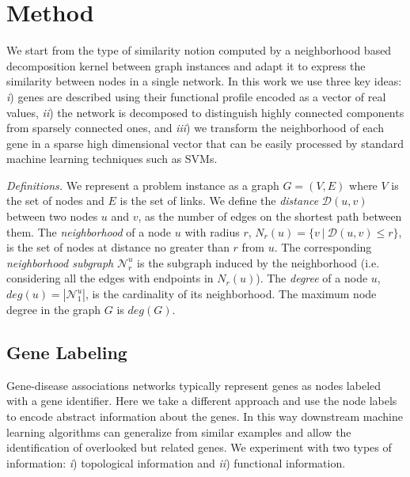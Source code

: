 \section{Method}
We start from the type of similarity notion computed by a neighborhood based decomposition kernel between graph instances and adapt it to express the similarity between nodes in a single network. In this work we use three key ideas: \textit{i}) genes are described using their functional profile encoded as a vector of real values, \textit{ii}) the network is decomposed to distinguish highly connected components from sparsely connected ones, and \textit{iii}) we transform the neighborhood of each gene in a sparse high dimensional vector that can be easily processed by standard machine learning techniques such as SVMs.

\textit{Definitions.} 
We represent a problem instance as a graph $G=(V,E)$ where $V$ is the set of nodes and $E$ is the set of links.
We define the \textit{distance} $\mathcal{D}(u,v)$ between two nodes $u$ and $v$, as the number of edges on the shortest path between them. The \textit{neighborhood} of a node $u$ with radius $r$, $N_r(u) = \lbrace v\ |\ \mathcal{D}(u,v) \leq r \rbrace$, is the set of nodes at distance no greater than $r$ from $u$. The corresponding \textit{neighborhood subgraph} $\mathcal{N}_{r}^{u}$ is the  subgraph induced by the neighborhood (i.e. considering all the edges with endpoints in $N_r(u)$). The \textit{degree} of a node $u$, $deg(u) = |\mathcal{N}_{1}^{u}|$, is the cardinality of its neighborhood. The maximum node degree in the graph $G$ is $deg(G)$.


\subsection{Gene Labeling} 
\label{sec:lab}
Gene-disease associations networks typically represent genes as nodes labeled with a gene identifier. Here we take a different approach and use the node labels to encode abstract information about the genes. In this way downstream machine learning algorithms can generalize from similar examples and allow the identification of overlooked but related genes. We experiment with two types of information: \textit{i}) topological information and \textit{ii}) functional information. 

